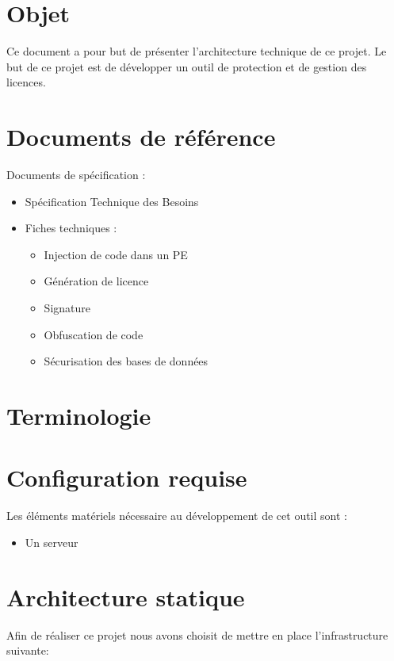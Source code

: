 \chapter{Objet}

Ce document a pour but de présenter l'architecture technique de ce projet. Le but de ce projet est de développer un outil de protection et de gestion des licences.

\chapter{Documents de référence}

Documents de spécification :

\begin{itemize}
    \item Spécification Technique des Besoins
    \item Fiches techniques :
	\begin{itemize}
	    \item Injection de code dans un PE
	    \item Génération de licence
	    \item Signature
	    \item Obfuscation de code
	    \item Sécurisation des bases de données
	\end{itemize}
\end{itemize}

\chapter{Terminologie}

\chapter{Configuration requise}

Les éléments matériels nécessaire au développement de cet outil sont :

\begin{itemize}
    \item Un serveur
\end{itemize}

\chapter{Architecture statique}
Afin de réaliser ce projet nous avons choisit de mettre en place l'infrastructure suivante:

